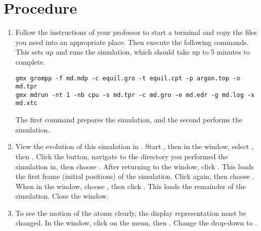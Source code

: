 \documentclass{article}
\begin{document}
\section{Procedure}
\begin{enumerate}
  \item Follow the instructions of your professor to start a terminal and copy the files you need into an appropriate place. Then execute the following commands. 
    This sets up and runs the simulation, which should take up to 5 minutes to complete.
\begin{Verbatim}
gmx grompp -f md.mdp -c equil.gro -t equil.cpt -p argon.top -o md.tpr
gmx mdrun -nt 1 -nb cpu -s md.tpr -c md.gro -e md.edr -g md.log -x md.xtc
\end{Verbatim}
The first command prepares the simulation, and the second performs the simulation.
  \item View the evolution of this simulation in .
    Start , then in the  window, select , then .
    Click the  button, navigate to the directory you performed the simulation in, then choose .
    After returning to the  window, click .
    This loads the first frame (initial positions) of the simulation.
    Click  again, then choose .
    When in the  window, choose , then click .
    This loads the remainder of the simulation.
    Close the  window.

  \item To see the motion of the atoms clearly, the display representation must be changed.
    In the  window, click on the  menu, then .
    Change the  drop-down to .


\end{enumerate}
\end{document}
